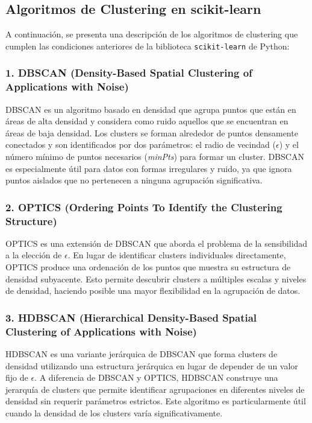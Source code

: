 \subsection*{Algoritmos de Clustering en scikit-learn}

A continuación, se presenta una descripción de los algoritmos de clustering que cumplen las condiciones anteriores de la biblioteca \texttt{scikit-learn} de Python:

\subsubsection*{1. DBSCAN (Density-Based Spatial Clustering of Applications with Noise)}

DBSCAN es un algoritmo basado en densidad que agrupa puntos que están en áreas de alta densidad y considera como ruido aquellos que se encuentran en áreas de baja densidad. Los clusters se forman alrededor de puntos densamente conectados y son identificados por dos parámetros: el radio de vecindad (\(\epsilon\)) y el número mínimo de puntos necesarios (\textit{minPts}) para formar un cluster. DBSCAN es especialmente útil para datos con formas irregulares y ruido, ya que ignora puntos aislados que no pertenecen a ninguna agrupación significativa.

\subsubsection*{2. OPTICS (Ordering Points To Identify the Clustering Structure)}

OPTICS es una extensión de DBSCAN que aborda el problema de la sensibilidad a la elección de \(\epsilon\). En lugar de identificar clusters individuales directamente, OPTICS produce una ordenación de los puntos que muestra su estructura de densidad subyacente. Esto permite descubrir clusters a múltiples escalas y niveles de densidad, haciendo posible una mayor flexibilidad en la agrupación de datos.

\subsubsection*{3. HDBSCAN (Hierarchical Density-Based Spatial Clustering of Applications with Noise)}

HDBSCAN es una variante jerárquica de DBSCAN que forma clusters de densidad utilizando una estructura jerárquica en lugar de depender de un valor fijo de \(\epsilon\). A diferencia de DBSCAN y OPTICS, HDBSCAN construye una jerarquía de clusters que permite identificar agrupaciones en diferentes niveles de densidad sin requerir parámetros estrictos. Este algoritmo es particularmente útil cuando la densidad de los clusters varía significativamente.


